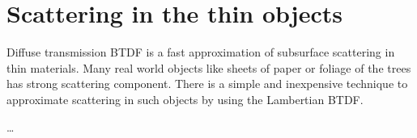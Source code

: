 \section{Scattering in the thin objects}
Diffuse transmission BTDF is a fast approximation of subsurface scattering
in thin materials.
Many real world objects like sheets of paper or foliage of the trees has strong
scattering component. There is a simple and inexpensive technique to approximate
scattering in such objects by using the Lambertian BTDF.

\ldots
